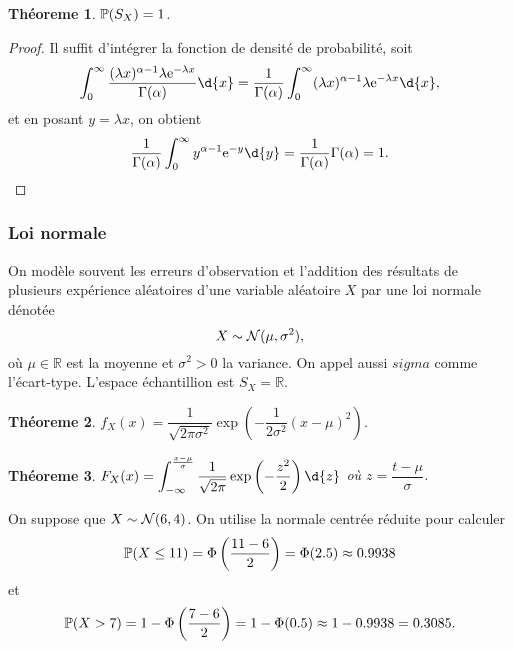 \documentclass[11pt]{article}
\renewcommand\P{%
	\ensuremath{%
		\mathbb{P}%
	}%
}%
\newcommand\e{%
	\ensuremath{%
		\mathrm{e}%
	}%
}%
\newcommand\Norm{%
	\ensuremath{%
		\mathcal{N}%
	}%
}%
\newtheorem{theoreme}{Théoreme}[section]
\begin{document}
\begin{theoreme}
	$\P(S_X)=1$.
\end{theoreme}

\begin{proof}
	Il suffit d'intégrer la fonction de densité de probabilité, soit
	\begin{equation*}
		\int_0^\infty
			\frac{(\lambda x)^{\alpha-1}\lambda\e^{-\lambda x}}{\Gamma(\alpha)}
		\d{x}=\frac{1}{\Gamma(\alpha)}\int_0^\infty
			(\lambda x)^{\alpha-1}\lambda\e^{-\lambda x}\d{x},
	\end{equation*}
	et en posant $y=\lambda x$, on obtient
	\begin{equation*}
		\frac{1}{\Gamma(\alpha)}\int_0^\infty y^{\alpha-1}\e^{-y}\d{y}
		=\frac{1}{\Gamma(\alpha)}\Gamma{(\alpha)}=1.
	\end{equation*}
\end{proof}

\subsubsection{Loi normale}
On modèle souvent les erreurs d'observation et l'addition des résultats de
plusieurs expérience aléatoires d'une variable aléatoire $X$ par une loi
normale dénotée
\begin{equation*}
	X\sim\Norm(\mu,\sigma^2),
\end{equation*}
où $\mu\in\mathbb{R}$ est la moyenne et $\sigma^2>0$ la variance. On appel
aussi $sigma$ comme l'écart-type. L'espace échantillion est $S_X=\mathbb{R}$.

\begin{theoreme}
	$f_X(x)=\dfrac{1}{\sqrt{2\pi\sigma^2}}\exp\left(
		{-\dfrac{1}{2\sigma^2}(x-\mu)^2}
	\right)$.
\end{theoreme}

\begin{theoreme}
	$F_X(x)=\displaystyle\int_{-\infty}^{\frac{x-\mu}{\sigma}}
		\dfrac{1}{\sqrt{2\pi}}\exp\left(-\dfrac{z^2}{2}\right)\d{z}$
	où $z=\dfrac{t-\mu}{\sigma}$.
\end{theoreme}

\begin{exemple}
	On suppose que $X\sim\Norm(6,4)$. On utilise la normale centrée réduite
	pour calculer
	\begin{equation*}
		\P(X\leq 11)
		=\Phi\left(\frac{11-6}{2}\right)
		=\Phi(2.5)
		\approx\SI{0.9938}{}
	\end{equation*}
	et
	\begin{equation*}
		\P(X> 7)
		=1-\Phi\left(\frac{7-6}{2}\right)
		=1-\Phi(0.5)
		\approx1-\SI{0.9938}{}
		=\SI{0.3085}{}.
	\end{equation*}
\end{exemple}
\end{document}
